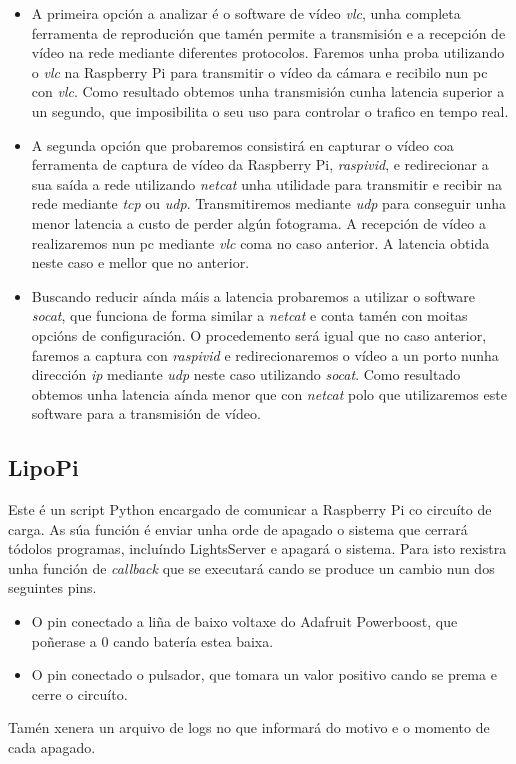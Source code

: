 \begin{itemize}
    \item A primeira opción a analizar é o software de vídeo \emph{vlc}, unha completa ferramenta de reprodución que tamén permite a transmisión e a recepción de vídeo na rede mediante diferentes protocolos. Faremos unha proba utilizando o \emph{vlc} na Raspberry Pi para transmitir o vídeo da cámara e recibilo nun pc con \emph{vlc}. Como resultado obtemos unha transmisión cunha latencia superior a un segundo, que imposibilita o seu uso para controlar o trafico en tempo real.

    \item A segunda opción que probaremos consistirá en capturar o vídeo coa ferramenta de captura de vídeo da Raspberry Pi, \emph{raspivid}, e redirecionar a sua saída a rede utilizando \emph{netcat} unha utilidade para transmitir e recibir na rede mediante \emph{tcp} ou \emph{udp}. Transmitiremos mediante \emph{udp} para conseguir unha menor latencia a custo de perder algún fotograma. A recepción de vídeo a realizaremos nun pc mediante \emph{vlc} coma no caso anterior. A latencia obtida neste caso e mellor que no anterior.

    \item Buscando reducir aínda máis a latencia probaremos a utilizar o software \emph{socat}, que funciona de forma similar a \emph{netcat} e conta tamén con moitas opcións de configuración. O procedemento será igual que no caso anterior, faremos a captura con \emph{raspivid} e redirecionaremos o vídeo a un porto nunha dirección \emph{ip} mediante \emph{udp} neste caso utilizando \emph{socat}. Como resultado obtemos unha latencia aínda menor que con \emph{netcat} polo que utilizaremos este software para a transmisión de vídeo.
\end{itemize}
\subsection{LipoPi}
Este é un script Python encargado de comunicar a Raspberry Pi co circuíto de carga. As súa función é enviar unha orde de apagado o sistema que cerrará tódolos programas, incluíndo LightsServer e apagará o sistema. Para isto rexistra unha función de \emph{callback} que se executará cando se produce un cambio nun dos seguintes pins.
\begin{itemize}
  \item  O pin conectado a liña de baixo voltaxe do Adafruit Powerboost, que poñerase a 0 cando batería estea baixa.
  \item  O pin conectado o pulsador, que tomara un valor positivo cando se prema e cerre o circuíto.
\end{itemize}
Tamén xenera un arquivo de logs no que informará do motivo e o momento de cada apagado.
